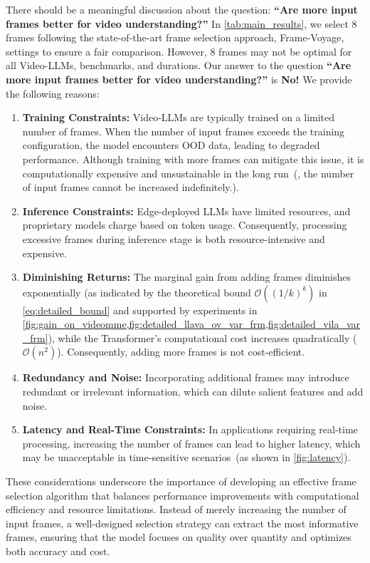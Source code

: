 There should be a meaningful discussion about the question: 
\textbf{``Are more input frames better for video understanding?''}
In \cref{tab:main_results}, we select 8 frames following the state-of-the-art frame selection approach, Frame-Voyage, settings to ensure a fair comparison. 
However, 8 frames may not be optimal for all Video-LLMs, benchmarks, and durations. 
Our answer to the question \textbf{``Are more input frames better for video understanding?''} is \textbf{No!}
We provide the following reasons:
\begin{enumerate}
	\item \textbf{Training Constraints:} Video-LLMs are typically trained on a limited number of frames. 
	When the number of input frames exceeds the training configuration, the model encounters OOD data, leading to degraded performance. 
	Although training with more frames can mitigate this issue, it is computationally expensive and unsustainable in the long run~(\ie, the number of input frames cannot be increased indefinitely.).
	
	\item \textbf{Inference Constraints:} Edge-deployed LLMs have limited resources, and proprietary models charge based on token usage. Consequently, processing excessive frames during inference stage is both resource-intensive and expensive.
	
	\item \textbf{Diminishing Returns:} 
	The marginal gain from adding frames diminishes exponentially (as indicated by the theoretical bound $\mathcal{O}((1/k)^k)$ in \cref{eq:detailed_bound} and supported by experiments in \cref{fig:gain_on_videomme,fig:detailed_llava_ov_var_frm,fig:detailed_vila_var_frm}), while the Transformer’s computational cost increases quadratically ($\mathcal{O}(n^2)$). Consequently, adding more frames is not cost-efficient.
	
	\item \textbf{Redundancy and Noise:} Incorporating additional frames may introduce redundant or irrelevant information, which can dilute salient features and add noise.

    \item \textbf{Latency and Real-Time Constraints:} In applications requiring real-time processing, increasing the number of frames can lead to higher latency, which may be unacceptable in time-sensitive scenarios~(as shown in \cref{fig:latency}).
\end{enumerate}
%
These considerations underscore the importance of developing an effective frame selection algorithm that balances performance improvements with computational efficiency and resource limitations. 
Instead of merely increasing the number of input frames, a well-designed selection strategy can extract the most informative frames, ensuring that the model focuses on quality over quantity and optimizes both accuracy and cost.

